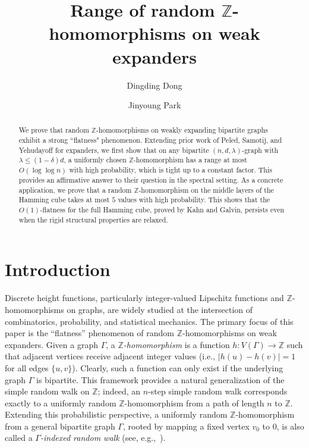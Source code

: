\documentclass{amsart}
\theoremstyle{definition}
\newcommand{\Z}{\mathbb{Z}}
\newcommand{\0}[0]{\emptyset}
\begin{document}
\title{Range of random $\mathbb Z$-homomorphisms on weak expanders}

\author[D. Dong]{Dingding Dong}
\address{Department of Mathematics, California Institute of Technology}

\author[J. Park]{Jinyoung Park}
\address{Department of Mathematics, Courant Institute of Mathematical Sciences, New York University}



\begin{abstract}
We prove that random $\mathbb{Z}$-homomorphisms on weakly expanding bipartite graphs exhibit a strong ``flatness" phenomenon. Extending prior work of Peled, Samotij, and Yehudayoff for expanders, we first show that on any bipartite $(n, d, \lambda)$-graph with $\lambda \le (1-\delta)d$, a uniformly chosen $\mathbb{Z}$-homomorphism has a range at most $O(\log \log n)$ with high probability, which is tight up to a constant factor. This provides an affirmative answer to their question in the spectral setting. As a concrete application, we prove that a random $\mathbb{Z}$-homomorphism on the middle layers of the Hamming cube takes at most $5$ values with high probability. This shows that the $O(1)$-flatness for the full Hamming cube, proved by Kahn and Galvin, persists even when the rigid structural properties are relaxed.
\end{abstract}

\maketitle

\section{Introduction}

Discrete height functions, particularly integer-valued Lipschitz functions and $\mathbb Z$-homomor\-phisms on graphs, are widely studied at the intersection of combinatorics, probability, and statistical mechanics. The primary focus of this paper is the ``flatness'' phenomenon of random $\mathbb{Z}$-homomorphisms on weak expanders. Given a graph $\Gamma$, a \textit{$\mathbb{Z}$-homomorphism} is a function $h:V(\Gamma) \rightarrow \mathbb Z$ such that adjacent vertices receive adjacent integer values (i.e., $|h(u)-h(v)|=1$ for all edges $\{u,v\}$). Clearly, such a function can only exist if the underlying graph $\Gamma$ is bipartite. This framework provides a natural generalization of the simple random walk on $\Z$; indeed, an $n$-step simple random walk corresponds exactly to a uniformly random $\Z$-homomorphism from a path of length $n$ to $\Z$. Extending this probabilistic perspective, a uniformly random $\mathbb Z$-homomorphism from a general bipartite graph $\Gamma$, rooted by mapping a fixed vertex $v_0$ to $0$, is also called a \emph{$\Gamma$-indexed random walk} (see, e.g.,~\cite{benjamini2000random,benjamini1994tree}).
\end{document}

